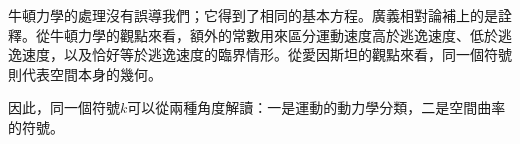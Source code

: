 牛頓力學的處理沒有誤導我們；它得到了相同的基本方程。廣義相對論補上的是詮釋。從牛頓力學的觀點來看，額外的常數用來區分運動速度高於逃逸速度、低於逃逸速度，以及恰好等於逃逸速度的臨界情形。從愛因斯坦的觀點來看，同一個符號則代表空間本身的幾何。

\begin{classroomqa}
\end{classroomqa}

因此，同一個符號\(k\)可以從兩種角度解讀：一是運動的動力學分類，二是空間曲率的符號。
